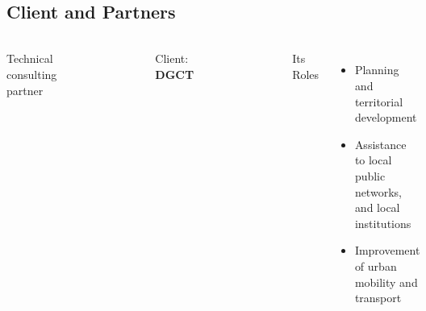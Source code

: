 \subsection{Client and Partners}
\begin{frame}{\insertsectionhead}
  \framesubtitle{\insertsubsectionhead}
  \begin{columns}[T,onlytextwidth]
    Technical consulting partner
    \begin{figure}
      \includegraphics[width=0.6\textwidth]{images/dynit.png}
    \end{figure}
    Client: \textbf{\textsc{DGCT}}
    \begin{figure}
      \includegraphics[width=0.8\textwidth]{images/logo-fr.png}
    \end{figure}
    Its Roles
    \begin{itemize}
          \item Planning and territorial development
          \item Assistance to local public networks, and
          local institutions
          \item Improvement of urban mobility and
          transport
    \end{itemize}
  \end{columns}
\end{frame}


